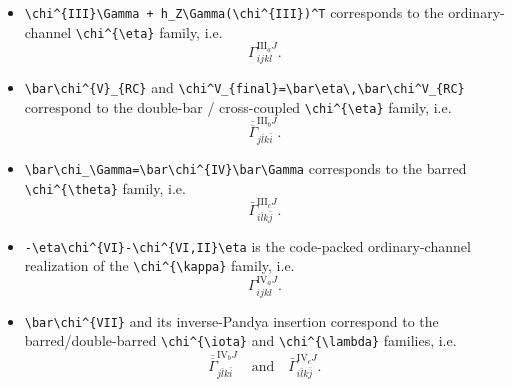 \documentclass[
]{article}
\providecommand{\tightlist}{%
  \setlength{\itemsep}{0pt}\setlength{\parskip}{0pt}}
\begin{document}
\begin{itemize}
\tightlist
\item
  \texttt{\textbackslash{}chi\^{}\{III\}\textbackslash{}Gamma\ +\ h\_Z\textbackslash{}Gamma(\textbackslash{}chi\^{}\{III\})\^{}T}
  corresponds to the ordinary-channel
  \texttt{\textbackslash{}chi\^{}\{\textbackslash{}eta\}} family, i.e.
  \begin{equation}
  \Gamma^{\mathrm{III}_aJ}_{ijkl}.
  \end{equation}
\item
  \texttt{\textbackslash{}bar\textbackslash{}chi\^{}\{V\}\_\{RC\}} and
  \texttt{\textbackslash{}chi\^{}V\_\{final\}=\textbackslash{}bar\textbackslash{}eta\textbackslash{},\textbackslash{}bar\textbackslash{}chi\^{}V\_\{RC\}}
  correspond to the double-bar / cross-coupled
  \texttt{\textbackslash{}chi\^{}\{\textbackslash{}eta\}} family, i.e.
  \begin{equation}
  \overline{\overline\Gamma}^{\mathrm{III}_bJ}_{j\bar l k\bar i}.
  \end{equation}
\item
  \texttt{\textbackslash{}bar\textbackslash{}chi\_\textbackslash{}Gamma=\textbackslash{}bar\textbackslash{}chi\^{}\{IV\}\textbackslash{}bar\textbackslash{}Gamma}
  corresponds to the barred
  \texttt{\textbackslash{}chi\^{}\{\textbackslash{}theta\}} family, i.e.
  \begin{equation}
  \bar\Gamma^{\mathrm{III}_cJ}_{i\bar l k\bar j}.
  \end{equation}
\item
  \texttt{-\textbackslash{}eta\textbackslash{}chi\^{}\{VI\}-\textbackslash{}chi\^{}\{VI,II\}\textbackslash{}eta}
  is the code-packed ordinary-channel realization of the
  \texttt{\textbackslash{}chi\^{}\{\textbackslash{}kappa\}} family, i.e.
  \begin{equation}
  \Gamma^{\mathrm{IV}_aJ}_{ijkl}.
  \end{equation}
\item
  \texttt{\textbackslash{}bar\textbackslash{}chi\^{}\{VII\}} and its
  inverse-Pandya insertion correspond to the barred/double-barred
  \texttt{\textbackslash{}chi\^{}\{\textbackslash{}iota\}} and
  \texttt{\textbackslash{}chi\^{}\{\textbackslash{}lambda\}} families,
  i.e. \begin{equation}
  \overline{\overline\Gamma}^{\mathrm{IV}_bJ}_{j\bar l k\bar i}
  \quad\text{and}\quad
  \bar\Gamma^{\mathrm{IV}_cJ}_{i\bar l k\bar j}.
  \end{equation}
\end{itemize}
\end{document}
